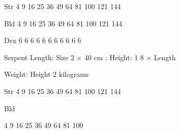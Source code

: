 \documentclass[twoside]{book}
\begin{document}
                    
                  
                  
                   Str   
                   4   
                   9   
                   16   
                   25   
                   36   
                   49   
                   64   
                   81   
                   100   
                   121   
                   144   
                  
                  
                   Bld   
                   4   
                   9   
                   16   
                   25   
                   36   
                   49   
                   64   
                   81   
                   100   
                   121   
                   144   
                  
                  
                   Dex   
                   6   
                   6   
                   6   
                   6   
                   6   
                   6   
                   6   
                   6   
                   6   
                   6   
                   6   
                  
                  
                   Serpent   
                    Length:   
                         Size  2 
                             \ensuremath{\times}  40  cm
                              ; Height:  
                            1  8   
                           \ensuremath{\times}  Length   
                    
                  
                  
                    
                     Weight:    Height
                      2    kilograms  
                     
                    
                  
                  
                   Str   
                   4   
                   9   
                   16   
                   25   
                   36   
                   49   
                   64   
                   81   
                   100   
                   121   
                   144   
                  
                  
                   Bld   
                  
                    
                    
                  
                    
                    
                   4   
                   9   
                   16   
                   25   
                   36   
                   49   
                   64   
                   81   
                   100   
                  
\end{document}
